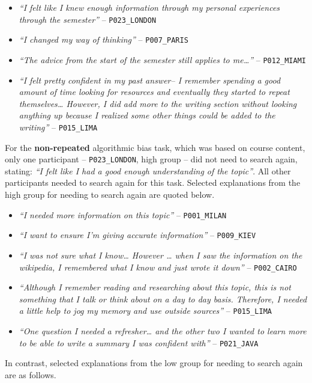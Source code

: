 \documentclass[letterpaper, nobind]{templates/ociamthesis}
\providecommand{\tightlist}{%
  \setlength{\itemsep}{0pt}\setlength{\parskip}{0pt}}
\begin{document}
\begin{itemize}
\tightlist
\item
  \emph{``I felt like I knew enough information through my personal experiences through the semester''} -- \texttt{P023\_LONDON}
\item
  \emph{``I changed my way of thinking''} -- \texttt{P007\_PARIS}
\item
  \emph{``The advice from the start of the semester still applies to me\ldots{}''} -- \texttt{P012\_MIAMI}
\item
  \emph{``I felt pretty confident in my past answer-- I remember spending a good amount of time looking for resources and eventually they started to repeat themselves\ldots{} However, I did add more to the writing section without looking anything up because I realized some other things could be added to the writing''} -- \texttt{P015\_LIMA}
\end{itemize}

For the \textbf{non-repeated} algorithmic bias task, which was based on course content, only one participant -- \texttt{P023\_LONDON}, high group -- did not need to search again, stating: \emph{``I felt like I had a good enough understanding of the topic''}.
All other participants needed to search again for this task.
Selected explanations from the high group for needing to search again are quoted below.

\begin{itemize}
\tightlist
\item
  \emph{``I needed more information on this topic''} -- \texttt{P001\_MILAN}
\item
  \emph{``I want to ensure I'm giving accurate information''} -- \texttt{P009\_KIEV}
\item
  \emph{``I was not sure what I know\ldots{} However \ldots{} when I saw the information on the wikipedia, I remembered what I know and just wrote it down''} -- \texttt{P002\_CAIRO}
\item
  \emph{``Although I remember reading and researching about this topic, this is not something that I talk or think about on a day to day basis. Therefore, I needed a little help to jog my memory and use outside sources''} -- \texttt{P015\_LIMA}
\item
  \emph{``One question I needed a refresher\ldots{} and the other two I wanted to learn more to be able to write a summary I was confident with''} -- \texttt{P021\_JAVA}
\end{itemize}

In contrast, selected explanations from the low group for needing to search again are as follows.
\end{document}
